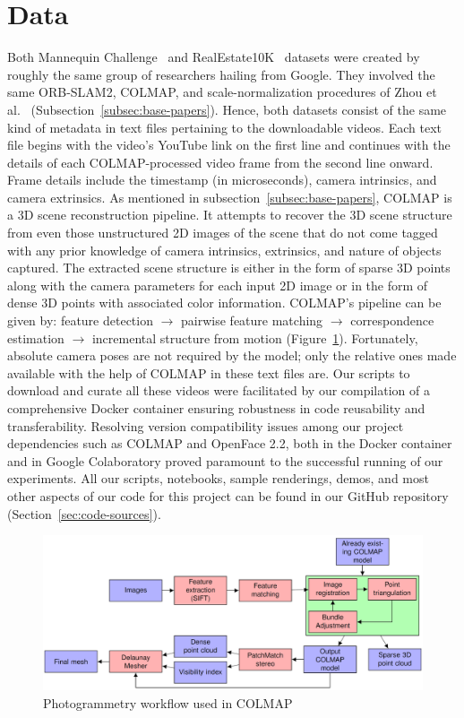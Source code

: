 \section{Data}\label{sec:data} 

Both Mannequin Challenge~\cite{li2019learning} and RealEstate10K~\cite{zhou2018stereo} datasets were created by roughly the same group of researchers hailing from Google. They involved the same ORB-SLAM2, COLMAP, and scale-normalization procedures of Zhou et al.~\cite{zhou2018stereo} (Subsection~\ref{subsec:base-papers}). Hence, both datasets consist of the same kind of metadata in text files pertaining to the downloadable videos. Each text file begins with the video’s YouTube link on the first line and continues with the details of each COLMAP-processed video frame from the second line onward. Frame details include the timestamp (in microseconds), camera intrinsics, and camera extrinsics. As mentioned in subsection~\ref{subsec:base-papers}, COLMAP is a 3D scene reconstruction pipeline. It attempts to recover the 3D scene structure from even those unstructured 2D images of the scene that do not come tagged with any prior knowledge of camera intrinsics, extrinsics, and nature of objects captured. The extracted scene structure is either in the form of sparse 3D points along with the camera parameters for each input 2D image or in the form of dense 3D points with associated color information. COLMAP's pipeline can be given by: feature detection $\rightarrow$ pairwise feature matching  $\rightarrow$ correspondence estimation $\rightarrow$ incremental structure from motion (Figure~\ref{fig:colmap-photogrammetry-pipeline}). Fortunately, absolute camera poses are not required by the model; only the relative ones made available with the help of COLMAP in these text files are. Our scripts to download and curate all these videos were facilitated by our compilation of a comprehensive Docker container ensuring robustness in code reusability and transferability. Resolving version compatibility issues among our project dependencies such as COLMAP and OpenFace 2.2, both in the Docker container and in Google Colaboratory proved paramount to the successful running of our experiments. All our scripts, notebooks, sample renderings, demos, and most other aspects of our code for this project can be found in our GitHub repository (Section~\ref{sec:code-sources}).

\begin{figure}[!h]
    \includegraphics[width=1\columnwidth]{figures/colmap-photogrammetry-pipeline.png}
    \caption{Photogrammetry workflow used in COLMAP~\cite{pinard_does_2021}}
    \label{fig:colmap-photogrammetry-pipeline}
\end{figure}
    
